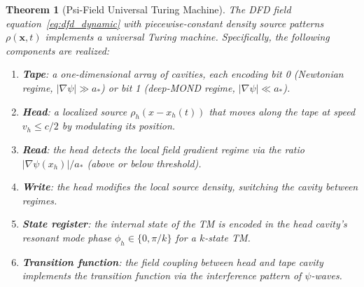 \documentclass[11pt]{article}
\newtheorem{theorem}{Theorem}[section]
\theoremstyle{definition}
\theoremstyle{remark}
\newcommand{\astar}{a_*}
\begin{document}
\begin{theorem}[Psi-Field Universal Turing Machine]
\label{thm:turing}
The DFD field equation~\eqref{eq:dfd_dynamic} with piecewise-constant
density source patterns $\rho(\mathbf{x},t)$ implements a universal Turing
machine. Specifically, the following components are realized:
\begin{enumerate}[label=(\roman*)]
\item \textbf{Tape}: a one-dimensional array of cavities, each encoding
  bit 0 (Newtonian regime, $|\nabla\psi|\gg\astar$) or bit 1 (deep-MOND
  regime, $|\nabla\psi|\ll\astar$).
\item \textbf{Head}: a localized source $\rho_h(x-x_h(t))$ that moves
  along the tape at speed $v_h \leq c/2$ by modulating its position.
\item \textbf{Read}: the head detects the local field gradient regime via
  the ratio $|\nabla\psi(x_h)|/\astar$ (above or below threshold).
\item \textbf{Write}: the head modifies the local source density, switching
  the cavity between regimes.
\item \textbf{State register}: the internal state of the TM is encoded in
  the head cavity's resonant mode phase $\phi_h \in \{0, \pi/k\}$ for a
  $k$-state TM.
\item \textbf{Transition function}: the field coupling between head and
  tape cavity implements the transition function via the interference
  pattern of $\psi$-waves.
\end{enumerate}
\end{theorem}
\end{document}
